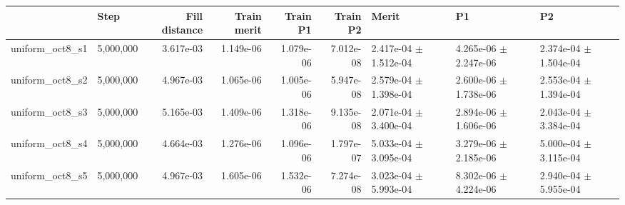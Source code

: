 \begin{tabular}{llrrrrlll}
\toprule
 & Step & Fill distance & Train merit & Train P1 & Train P2 & Merit & P1 & P2 \\
\midrule
uniform\_oct8\_s1 & 5,000,000 & 3.617e-03 & 1.149e-06 & 1.079e-06 & 7.012e-08 & 2.417e-04 $\pm$ 1.512e-04 & 4.265e-06 $\pm$ 2.247e-06 & 2.374e-04 $\pm$ 1.504e-04 \\
uniform\_oct8\_s2 & 5,000,000 & 4.967e-03 & 1.065e-06 & 1.005e-06 & 5.947e-08 & 2.579e-04 $\pm$ 1.398e-04 & 2.600e-06 $\pm$ 1.738e-06 & 2.553e-04 $\pm$ 1.394e-04 \\
uniform\_oct8\_s3 & 5,000,000 & 5.165e-03 & 1.409e-06 & 1.318e-06 & 9.135e-08 & 2.071e-04 $\pm$ 3.400e-04 & 2.894e-06 $\pm$ 1.606e-06 & 2.043e-04 $\pm$ 3.384e-04 \\
uniform\_oct8\_s4 & 5,000,000 & 4.664e-03 & 1.276e-06 & 1.096e-06 & 1.797e-07 & 5.033e-04 $\pm$ 3.095e-04 & 3.279e-06 $\pm$ 2.185e-06 & 5.000e-04 $\pm$ 3.115e-04 \\
uniform\_oct8\_s5 & 5,000,000 & 4.967e-03 & 1.605e-06 & 1.532e-06 & 7.274e-08 & 3.023e-04 $\pm$ 5.993e-04 & 8.302e-06 $\pm$ 4.224e-06 & 2.940e-04 $\pm$ 5.955e-04 \\
\bottomrule
\end{tabular}
